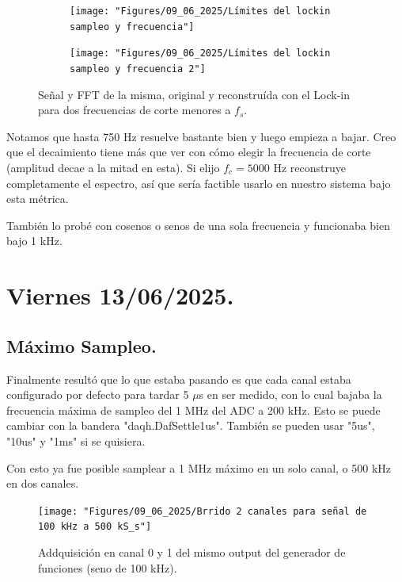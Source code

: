 \begin{figure}[!ht]
	\begin{minipage}[c]{0.5\textwidth}
		\begin{subfigure}{\textwidth}
			\centering
			\texttt{[image: "Figures/09\_06\_2025/Límites del lockin sampleo y frecuencia"]}
			\captionsetup{width=0.8\textwidth}
		\end{subfigure}
	\end{minipage}\begin{minipage}[c]{0.49\textwidth}
		\begin{subfigure}{\textwidth}
			\centering
			\texttt{[image: "Figures/09\_06\_2025/Límites del lockin sampleo y frecuencia 2"]}
			\captionsetup{width=0.8\textwidth}
		\end{subfigure}
	\end{minipage}
	\caption{ Señal y FFT de la misma, original y reconstruída con el Lock-in para dos frecuencias de corte menores a $f_s$.}
	\label{fig:limites-del-lockin-sampleo-y-frecuencia}
\end{figure}

Notamos que hasta 750 Hz resuelve bastante bien y luego empieza a bajar. Creo que el decaimiento tiene más que ver con cómo elegir la frecuencia de corte (amplitud decae a la mitad en esta). Si elijo $f_c=5000$ Hz reconstruye completamente el espectro, así que sería factible usarlo en nuestro sistema bajo esta métrica.


También lo probé con cosenos o senos de una sola frecuencia y funcionaba bien bajo 1 kHz.

\section{Viernes 13/06/2025.}
\subsection*{Máximo Sampleo.}
Finalmente resultó que lo que estaba pasando es que cada canal estaba configurado por defecto para tardar 5 $\mu$s en ser medido, con lo cual bajaba la frecuencia máxima de sampleo del 1 MHz del ADC a 200 kHz. Esto se puede cambiar con la bandera "daqh.DafSettle1us". También se pueden usar "5us", "10us" y "1ms" si se quisiera. 

Con esto ya fue posible samplear a 1 MHz máximo en un solo canal, o 500 kHz en dos canales. 

\begin{figure}[th!]
	\centering
	\texttt{[image: "Figures/09\_06\_2025/Brrido 2 canales para señal de 100 kHz a 500 kS\_s"]}
	\caption{Addquisición en canal 0 y 1 del mismo output del generador de funciones (seno de 100 kHz).}
	\label{fig:brrido-2-canales-para-senal-de-100-khz-a-500-kss}
\end{figure}

